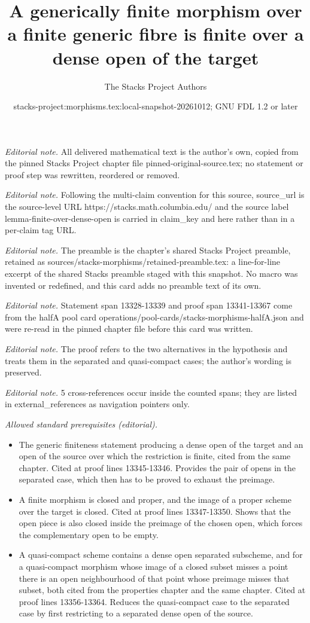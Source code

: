 \documentclass[10pt,a4paper]{amsart}
\title{A generically finite morphism over a finite generic fibre is finite over a dense open of the target}
\author{The Stacks Project Authors}
\date{stacks-project:morphisms.tex:local-snapshot-20261012; GNU FDL 1.2 or later}
\theoremstyle{plain}
\theoremstyle{definition}
\theoremstyle{remark}
\numberwithin{equation}{subsection}
\begin{document}
\maketitle
\noindent\textit{Editorial note.} All delivered mathematical text is the author's own, copied from the pinned Stacks Project chapter file pinned-original-source.tex; no statement or proof step was rewritten, reordered or removed.\par\medskip
\noindent\textit{Editorial note.} Following the multi-claim convention for this source, source\_url is the source-level URL https://stacks.math.columbia.edu/ and the source label lemma-finite-over-dense-open is carried in claim\_key and here rather than in a per-claim tag URL.\par\medskip
\noindent\textit{Editorial note.} The preamble is the chapter's shared Stacks Project preamble, retained as sources/stacks-morphisms/retained-preamble.tex: a line-for-line excerpt of the shared Stacks preamble staged with this snapshot. No macro was invented or redefined, and this card adds no preamble text of its own.\par\medskip
\noindent\textit{Editorial note.} Statement span 13328-13339 and proof span 13341-13367 come from the halfA pool card operations/pool-cards/stacks-morphisms-halfA.json and were re-read in the pinned chapter file before this card was written.\par\medskip
\noindent\textit{Editorial note.} The proof refers to the two alternatives in the hypothesis and treats them in the separated and quasi-compact cases; the author's wording is preserved.\par\medskip
\noindent\textit{Editorial note.} 5 cross-references occur inside the counted spans; they are listed in external\_references as navigation pointers only.\par\medskip
\noindent\textit{Allowed standard prerequisites (editorial).}\begin{itemize}
\item The generic finiteness statement producing a dense open of the target and an open of the source over which the restriction is finite, cited from the same chapter. Cited at proof lines 13345-13346. Provides the pair of opens in the separated case, which then has to be proved to exhaust the preimage.
\item A finite morphism is closed and proper, and the image of a proper scheme over the target is closed. Cited at proof lines 13347-13350. Shows that the open piece is also closed inside the preimage of the chosen open, which forces the complementary open to be empty.
\item A quasi-compact scheme contains a dense open separated subscheme, and for a quasi-compact morphism whose image of a closed subset misses a point there is an open neighbourhood of that point whose preimage misses that subset, both cited from the properties chapter and the same chapter. Cited at proof lines 13356-13364. Reduces the quasi-compact case to the separated case by first restricting to a separated dense open of the source.
\end{itemize}\medskip
\end{document}
